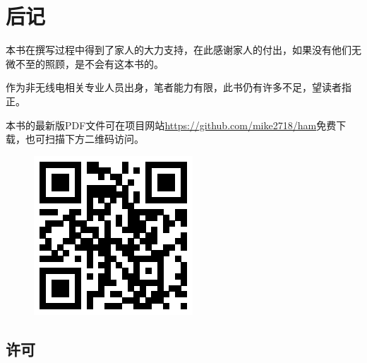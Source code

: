 \chapter*{后记}

本书在撰写过程中得到了家人的大力支持，在此感谢家人的付出，如果没有他们无微不至的照顾，是不会有这本书的。

作为非无线电相关专业人员出身，笔者能力有限，此书仍有许多不足，望读者指正。

本书的最新版PDF文件可在项目网站\url{https://github.com/mike2718/ham}免费下载，也可扫描下方二维码访问。

\begin{figure}[h]
	\includegraphics{site}
	\centering
\end{figure}

\section*{许可}

{}